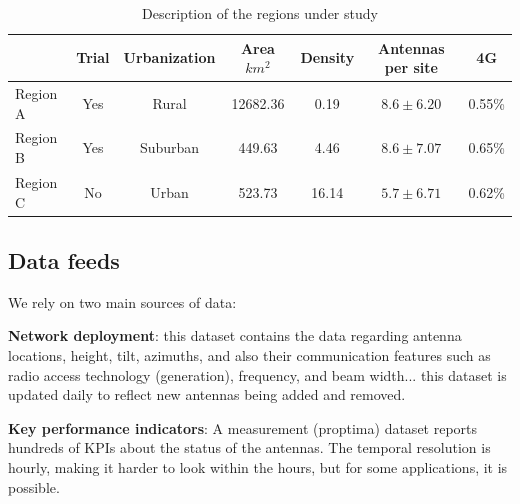 \begin{table}[ht]
    \centering
    \begin{tabular}{lcccccc}
    \toprule
     & Trial & Urbanization & Area $km^2$ & Density & Antennas per site & 4G \\
    \midrule
    Region A & Yes & Rural & 12682.36 & 0.19 & $8.6 \pm 6.20$ & 0.55\% \\
    Region B & Yes & Suburban & 449.63 & 4.46 & $8.6 \pm 7.07$ & 0.65\% \\
    Region C & No & Urban & 523.73 & 16.14 & $5.7 \pm 6.71$ & 0.62\% \\
    \bottomrule
    \end{tabular}
    
    \caption{Description of the regions under study }
    \label{tab:regions}
\end{table}

\subsection{Data feeds}

We rely on two main sources of data: 

\textbf{Network deployment}:
this dataset contains the data regarding antenna locations, height, tilt, azimuths, and also their communication features such as radio access technology (generation), frequency, and beam width... this dataset is updated daily to reflect new antennas being added and removed. 

\textbf{Key performance indicators}:
A measurement (proptima) dataset reports hundreds of KPIs about the status of the antennas. The temporal resolution is hourly, making it harder to look within the hours, but for some applications, it is possible.